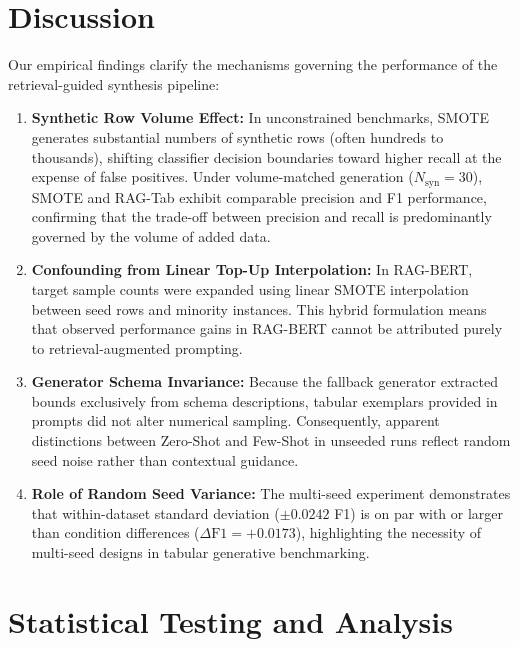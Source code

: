 \documentclass[sn-basic]{sn-jnl}
\begin{document}
\section{Discussion}
\label{sec:discussion}

Our empirical findings clarify the mechanisms governing the performance of the retrieval-guided synthesis pipeline:
\begin{enumerate}
    \item \textbf{Synthetic Row Volume Effect:} In unconstrained benchmarks, SMOTE generates substantial numbers of synthetic rows (often hundreds to thousands), shifting classifier decision boundaries toward higher recall at the expense of false positives. Under volume-matched generation ($N_{\text{syn}} = 30$), SMOTE and RAG-Tab exhibit comparable precision and F1 performance, confirming that the trade-off between precision and recall is predominantly governed by the volume of added data.
    \item \textbf{Confounding from Linear Top-Up Interpolation:} In RAG-BERT, target sample counts were expanded using linear SMOTE interpolation between seed rows and minority instances. This hybrid formulation means that observed performance gains in RAG-BERT cannot be attributed purely to retrieval-augmented prompting.
    \item \textbf{Generator Schema Invariance:} Because the fallback generator extracted bounds exclusively from schema descriptions, tabular exemplars provided in prompts did not alter numerical sampling. Consequently, apparent distinctions between Zero-Shot and Few-Shot in unseeded runs reflect random seed noise rather than contextual guidance.
    \item \textbf{Role of Random Seed Variance:} The multi-seed experiment demonstrates that within-dataset standard deviation ($\pm 0.0242$ F1) is on par with or larger than condition differences ($\Delta \text{F1} = +0.0173$), highlighting the necessity of multi-seed designs in tabular generative benchmarking.
\end{enumerate}

\section{Statistical Testing and Analysis}
\label{sec:statistics}
\end{document}
